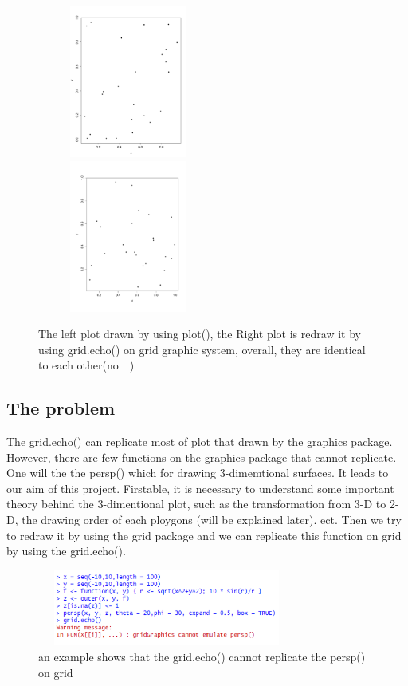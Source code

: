 \documentclass[a4paper,10pt]{article}
\begin{document}
\begin{figure}[h]
\begin{center}
  \includegraphics[height = 5cm, width = 6cm]{figure/Bplot.pdf}
  \includegraphics[height = 5cm, width = 6cm]{figure/Gplot.pdf}
  \caption{The left plot drawn by using plot(), the Right plot is redraw it by using grid.echo() on grid graphic system, overall, they are identical to each other(no~~)}
  	\label{figure1}
\end{center}
\end{figure}

\subsection{The problem}
The grid.echo() can replicate most of plot that drawn by the graphics package. However, there are few functions on the graphics package that cannot replicate. One will the the persp() which for drawing 3-dimemtional surfaces. It leads to our aim of this project. Firstable, it is necessary to understand some important theory behind the 3-dimentional plot, such as the transformation from 3-D to 2-D, the drawing order of each ploygons (will be explained later). ect. Then we try to redraw it by using the grid package and we can replicate this function on grid by using the grid.echo().

\begin{figure}[h]
  \includegraphics[height = 2.5cm, width = 8.5cm]{figure/warning.png}
  \caption{an example shows that the grid.echo() cannot replicate the persp() on grid}
  	\label{figure2}
\end{figure}
\end{document}
